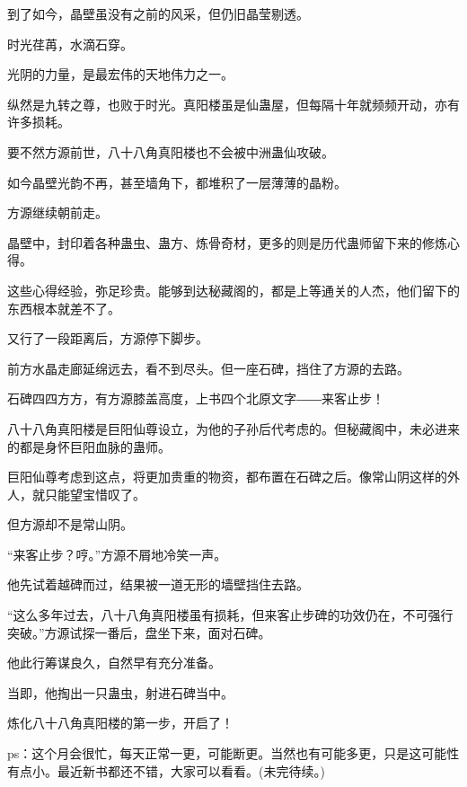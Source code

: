 \begin{this_body}
到了如今，晶壁虽没有之前的风采，但仍旧晶莹剔透。

时光荏苒，水滴石穿。

光阴的力量，是最宏伟的天地伟力之一。

纵然是九转之尊，也败于时光。真阳楼虽是仙蛊屋，但每隔十年就频频开动，亦有许多损耗。

要不然方源前世，八十八角真阳楼也不会被中洲蛊仙攻破。

如今晶壁光韵不再，甚至墙角下，都堆积了一层薄薄的晶粉。

方源继续朝前走。

晶壁中，封印着各种蛊虫、蛊方、炼骨奇材，更多的则是历代蛊师留下来的修炼心得。

这些心得经验，弥足珍贵。能够到达秘藏阁的，都是上等通关的人杰，他们留下的东西根本就差不了。

又行了一段距离后，方源停下脚步。

前方水晶走廊延绵远去，看不到尽头。但一座石碑，挡住了方源的去路。

石碑四四方方，有方源膝盖高度，上书四个北原文字――来客止步！

八十八角真阳楼是巨阳仙尊设立，为他的子孙后代考虑的。但秘藏阁中，未必进来的都是身怀巨阳血脉的蛊师。

巨阳仙尊考虑到这点，将更加贵重的物资，都布置在石碑之后。像常山阴这样的外人，就只能望宝惜叹了。

但方源却不是常山阴。

“来客止步？哼。”方源不屑地冷笑一声。

他先试着越碑而过，结果被一道无形的墙壁挡住去路。

“这么多年过去，八十八角真阳楼虽有损耗，但来客止步碑的功效仍在，不可强行突破。”方源试探一番后，盘坐下来，面对石碑。

他此行筹谋良久，自然早有充分准备。

当即，他掏出一只蛊虫，射进石碑当中。

炼化八十八角真阳楼的第一步，开启了！

ps：这个月会很忙，每天正常一更，可能断更。当然也有可能多更，只是这可能性有点小。最近新书都还不错，大家可以看看。(未完待续。)

\end{this_body}

